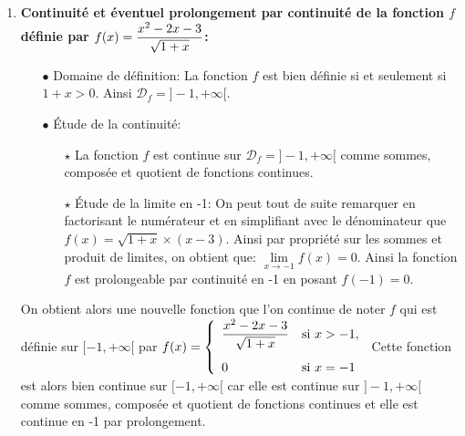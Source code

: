 \documentclass[a4paper, 11pt,reqno]{article}
\begin{document}
\begin{correction}
\begin{enumerate}
\begin{itemize}
\begin{itemize}
				            \item[$\star$] \'Etude de la limite en 1: Comme $f(x)=\ddp\frac{-1}{1+x}$, on obtient que: $\lim\limits_{x\to 1} f(x)=-\ddp\demi$. Ainsi la fonction $f$ est prolongeable par continuit\'e en 1 en posant $f(1)=-\ddp\demi$.
			            \end{itemize}
		      \end{itemize}
		      On obtient alors une nouvelle fonction que l'on continue de noter $f$ qui est d\'efinie sur $\R\setminus\lbrace -1\rbrace$ par $f(x)=\left\lbrace \begin{array}{ll}  \ddp\frac{1}{1-x}-\ddp\frac{2}{1-x^2}& \hbox{si}\ x\not= 1,\ x\not= -1\vsec\\ -\ddp\demi & \hbox{si}\ x=1  \end{array}\right.$ Cette fonction est alors bien continue sur $\R\setminus\lbrace -1\rbrace$ car elle est continue sur $\R\setminus\lbrace -1,1\rbrace$ comme  sommes et quotients de fonctions continues et elle est continue en 1 par prolongement.
		\item \textbf{Continuit\'e et \'eventuel prolongement par continuit\'e de la fonction $f$ d\'efinie par $f(x)=\displaystyle\frac{x^2-2x-3}{\sqrt{1+x}}$:}
		      \begin{itemize}
			      \item[$\bullet$] Domaine de d\'efinition: La fonction $f$ est bien d\'efinie si et seulement si $1+x>0$. Ainsi $\mathcal{D}_{f}=\rbrack -1,+\infty\lbrack$.
			      \item[$\bullet$] \'Etude de la continuit\'e:
			            \begin{itemize}
				            \item[$\star$] La fonction $f$ est continue sur $\mathcal{D}_{f}=\rbrack -1,+\infty\lbrack$ comme sommes, compos\'ee et quotient de fonctions continues.
				            \item[$\star$] \'Etude de la limite en -1: On peut tout de suite remarquer en factorisant le num\'erateur et en simplifiant avec le d\'enominateur que $f(x)=\sqrt{1+x}\times (x-3)$. Ainsi par propri\'et\'e sur les sommes et produit de limites, on obtient que: $\lim\limits_{x\to -1} f(x)=0$. Ainsi la fonction $f$ est prolongeable par continuit\'e en -1 en posant $f(-1)=0$.
			            \end{itemize}
		      \end{itemize}
		      On obtient alors une nouvelle fonction que l'on continue de noter $f$ qui est d\'efinie sur $\lbrack -1,+\infty\lbrack$ par $f(x)=\left\lbrace \begin{array}{ll}  \ddp\frac{x^2-2x-3}{\sqrt{1+x}}& \hbox{si}\ x>-1,\vsec\\ 0 & \hbox{si}\ x=-1  \end{array}\right.$ Cette fonction est alors bien continue sur $\lbrack -1,+\infty\lbrack$ car elle est continue sur $\rbrack -1,+\infty\lbrack$ comme  sommes, compos\'ee et quotient de fonctions continues et elle est continue en -1 par prolongement.

\end{enumerate}
\end{correction}
\end{document}
